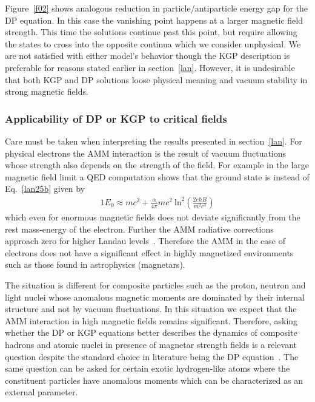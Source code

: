 Figure~\ref{f02} shows analogous reduction in particle/anti\-particle energy gap for the DP equation. In this case the vanishing point happens at a larger magnetic field strength. This time the solutions continue past this point, but require allowing the states to cross into the opposite continua which we consider unphysical. We are not satisfied with either model\rq s behavior though the KGP description is preferable for reasons stated earlier in section~\ref{lan}. However, it is undesirable that both KGP and DP solutions loose physical meaning and vacuum stability in strong magnetic fields.

\subsubsection{Applicability of DP or KGP to critical fields}\label{vacfl}
Care must be taken when interpreting the results presented in section~\ref{lan}. For physical electrons the AMM interaction is the result of vacuum fluctuations whose strength also depends on the strength of the field. For example in the large magnetic field limit a QED computation shows that the ground state is instead of Eq.~\eqref{lan25b} given by~\cite{Jancovici:1970ep}
\begin{alignat}{1} \label{vacfl01}
E_{0}\approx mc^{2}+\frac{\alpha}{4\pi}mc^{2}\ \mathrm{ln}^{2}\left(\frac{2e\hbar B}{m^{2}c^{3}}\right)
\end{alignat}
which even for enormous magnetic fields does not deviate significantly from the rest mass-energy of the electron. Further the AMM  radiative corrections approach zero for higher Landau levels~\cite{Ferrer:2015wca}. Therefore the AMM in the case of electrons does not have a significant effect in highly magnetized environments such as those found in astrophysics (magnetars).

The situation is different for composite particles such as the proton, neutron and light nuclei whose anomalous magnetic moments are dominated by their internal structure and not by vacuum fluctuations. In this situation we expect that the AMM interaction in high magnetic fields remains significant. Therefore, asking whether the DP or KGP equations better describes the dynamics of composite hadrons and atomic nuclei in presence of magnetar strength fields is a relevant question despite the standard choice in literature being the DP equation~\cite{Broderick:2000pe}. The same question can be asked for certain exotic hydrogen-like atoms where the constituent particles have anomalous moments which can be characterized as an external parameter. 

